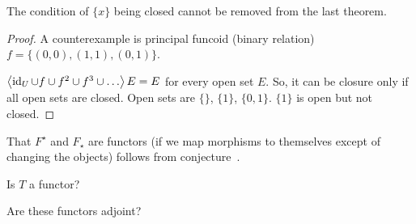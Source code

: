 \begin{example}
The condition of $\{x\}$ being closed cannot be removed from
the last theorem.
\end{example}

\begin{proof}
A counterexample is principal funcoid (binary relation)
$f = \{ (0, 0), (1, 1), (0, 1) \}$.

$\left\langle \operatorname{id}_U \cup f \cup f^2 \cup f^3 \cup \ldots\right\rangle E = E$ for every open set $E$.
So, it can be closure only if all open sets are closed.
Open sets are $\{ \}$, $\{ 1 \}$, $\{ 0, 1 \}$. $\{ 1 \}$ is open but
not closed.
\end{proof}

That $F^{\star}$ and $F_{\star}$ are functors (if we map morphisms to
themselves except of changing the objects) follows from
conjecture~.

Is $T$ a functor?

Are these functors adjoint?
